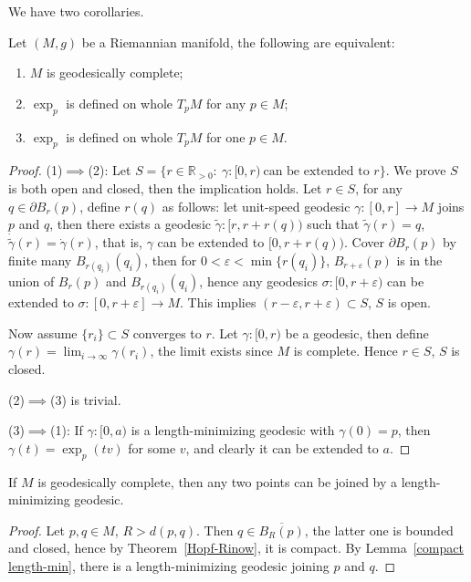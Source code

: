 We have two corollaries.

\begin{cor}
    Let $(M,g)$ be a Riemannian manifold, the following are equivalent:
    \begin{enumerate}[(1)]
        \item $M$ is geodesically complete;
        \item $\exp_p$ is defined on whole $T_pM$ for any $p\in M$;
        \item $\exp_p$ is defined on whole $T_pM$ for one $p\in M$.
    \end{enumerate}
\end{cor}
\begin{proof}
    (1)$\implies$(2): Let $S=\{r\in\mathbb{R}_{>0}:\ \gamma:[0,r)\ \text{can be extended to }r\}$.
    We prove $S$ is both open and closed, then the implication holds.
    Let $r\in S$, for any $q\in\partial B_r(p)$, define $r(q)$ as follows:
    let unit-speed geodesic $\gamma:[0,r]\to M$ joins $p$ and $q$, then there exists a geodesic $\tilde\gamma:[r,r+r(q))$ such that $\tilde\gamma(r)=q$, $\dot{\tilde\gamma}(r)=\dot\gamma(r)$, that is, $\gamma$ can be extended to $[0,r+r(q))$.
    Cover $\partial B_r(p)$ by finite many $B_{r(q_i)}(q_i)$, then for $0<\varepsilon<\min\{r(q_i)\}$, $B_{r+\varepsilon}(p)$ is in the union of $B_r(p)$ and $B_{r(q_i)}(q_i)$, hence any geodesics $\sigma:[0,r+\varepsilon)$ can be extended to $\sigma:[0,r+\varepsilon]\to M$.
    This implies $(r-\varepsilon,r+\varepsilon)\subset S$, $S$ is open.

    Now assume $\{r_i\}\subset S$ converges to $r$.
    Let $\gamma:[0,r)$ be a geodesic, then define $\gamma(r)=\lim_{i\to\infty}\gamma(r_i)$, the limit exists since $M$ is complete.
    Hence $r\in S$, $S$ is closed.

    (2)$\implies$(3) is trivial.

    (3)$\implies$(1): If $\gamma:[0,a)$ is a length-minimizing geodesic with $\gamma(0)=p$, then $\gamma(t)=\exp_p(tv)$ for some $v$, and clearly it can be extended to $a$.
\end{proof}

\begin{cor}
    If $M$ is geodesically complete, then any two points can be joined by a length-minimizing geodesic.
\end{cor}
\begin{proof}
    Let $p,q\in M$, $R>d(p,q)$.
    Then $q\in\overline{B_R(p)}$, the latter one is bounded and closed, hence by Theorem~\ref{Hopf-Rinow}, it is compact.
    By Lemma~\ref{compact length-min}, there is a length-minimizing geodesic joining $p$ and $q$.
\end{proof}